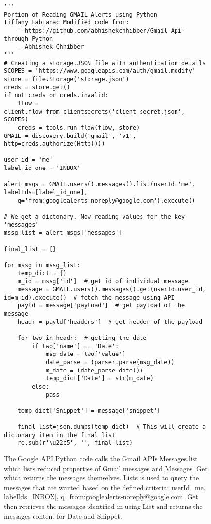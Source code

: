 \documentclass[sigconf]{acmart}
\begin{document}
\begin{figure}[htb]
\begin{verbatim}
'''
Portion of Reading GMAIL Alerts using Python
Tiffany Fabianac Modified code from:
    - https://github.com/abhishekchhibber/Gmail-Api-through-Python
	- Abhishek Chhibber
'''
# Creating a storage.JSON file with authentication details
SCOPES = 'https://www.googleapis.com/auth/gmail.modify' 
store = file.Storage('storage.json')
creds = store.get()
if not creds or creds.invalid:
    flow = client.flow_from_clientsecrets('client_secret.json', SCOPES)
    creds = tools.run_flow(flow, store)
GMAIL = discovery.build('gmail', 'v1', http=creds.authorize(Http()))

user_id = 'me'
label_id_one = 'INBOX'

alert_msgs = GMAIL.users().messages().list(userId='me', labelIds=[label_id_one], 
	q='from:googlealerts-noreply@google.com').execute()

# We get a dictonary. Now reading values for the key 'messages'
mssg_list = alert_msgs['messages']

final_list = []

for mssg in mssg_list:
    temp_dict = {}
    m_id = mssg['id']  # get id of individual message
    message = GMAIL.users().messages().get(userId=user_id, id=m_id).execute()  # fetch the message using API
    payld = message['payload']  # get payload of the message
    headr = payld['headers']  # get header of the payload

    for two in headr:  # getting the date
        if two['name'] == 'Date':
            msg_date = two['value']
            date_parse = (parser.parse(msg_date))
            m_date = (date_parse.date())
            temp_dict['Date'] = str(m_date)
        else:
            pass

    temp_dict['Snippet'] = message['snippet']

    final_list=json.dumps(temp_dict)  # This will create a dictonary item in the final list
    re.sub(r'\u22c5', '', final_list)
\end{verbatim}
\caption{The Google API Python code calls the Gmail APIs Messages.list which lists reduced properties of Gmail messages and Messages. Get which returns the messages themselves. Lists is used to query the messages that are wanted based on the defined criteria: userId=me, labelIds=INBOX], q=from:googlealerts-noreply@google.com. Get then retrieves the messages identified in using List and returns the messages content for Date and Snippet.}\label{c:googleapi}
\end{figure}
\end{document}
